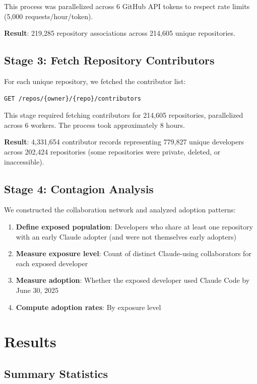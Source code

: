 \documentclass[11pt]{article}
\begin{document}
This process was parallelized across 6 GitHub API tokens to respect rate limits (5,000 requests/hour/token).

\textbf{Result}: 219,285 repository associations across 214,605 unique repositories.

\subsection{Stage 3: Fetch Repository Contributors}

For each unique repository, we fetched the contributor list:

\begin{verbatim}
GET /repos/{owner}/{repo}/contributors
\end{verbatim}

This stage required fetching contributors for 214,605 repositories, parallelized across 6 workers. The process took approximately 8 hours.

\textbf{Result}: 4,331,654 contributor records representing 779,827 unique developers across 202,424 repositories (some repositories were private, deleted, or inaccessible).

\subsection{Stage 4: Contagion Analysis}

We constructed the collaboration network and analyzed adoption patterns:

\begin{enumerate}
    \item \textbf{Define exposed population}: Developers who share at least one repository with an early Claude adopter (and were not themselves early adopters)
    \item \textbf{Measure exposure level}: Count of distinct Claude-using collaborators for each exposed developer
    \item \textbf{Measure adoption}: Whether the exposed developer used Claude Code by June 30, 2025
    \item \textbf{Compute adoption rates}: By exposure level
\end{enumerate}

\section{Results}

\subsection{Summary Statistics}
\end{document}
